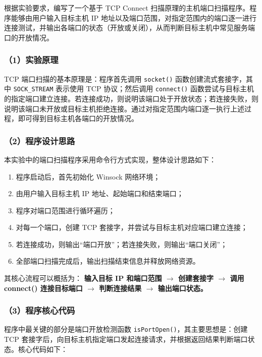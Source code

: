 \documentclass[12pt]{ctexart}
\begin{document}
根据实验要求，编写了一个基于 TCP Connect 扫描原理的主机端口扫描程序。程序能够由用户输入目标主机 IP 地址以及端口范围，对指定范围内的端口逐一进行连接测试，并输出各端口的状态（开放或关闭），从而判断目标主机中常见服务端口的开放情况。

\subsubsection*{（1）实验原理}

TCP 端口扫描的基本原理是：程序首先调用 \texttt{socket()} 函数创建流式套接字，其中 \texttt{SOCK\_STREAM} 表示使用 TCP 协议；然后调用 \texttt{connect()} 函数尝试与目标主机的指定端口建立连接。若连接成功，则说明该端口处于开放状态；若连接失败，则说明该端口未开放或目标主机拒绝连接。通过对指定范围内端口逐一执行上述过程，即可得到目标主机各端口的开放情况。

\subsubsection*{（2）程序设计思路}

本实验中的端口扫描程序采用命令行方式实现，整体设计思路如下：

\begin{enumerate}
    \item 程序启动后，首先初始化 Winsock 网络环境；
    \item 由用户输入目标主机 IP 地址、起始端口和结束端口；
    \item 程序对端口范围进行循环遍历；
    \item 对每一个端口，创建 TCP 套接字，并尝试与目标主机对应端口建立连接；
    \item 若连接成功，则输出“端口开放”；若连接失败，则输出“端口关闭”；
    \item 全部端口扫描完成后，输出扫描结束信息并释放网络资源。
\end{enumerate}

其核心流程可以概括为：  
\textbf{输入目标 IP 和端口范围 $\rightarrow$ 创建套接字 $\rightarrow$ 调用 connect() 连接目标端口 $\rightarrow$ 判断连接结果 $\rightarrow$ 输出端口状态。}

\subsubsection*{（3）程序核心代码}

程序中最关键的部分是端口开放检测函数 \texttt{isPortOpen()}，其主要思想是：创建 TCP 套接字后，向目标主机指定端口发起连接请求，并根据返回结果判断端口状态。核心代码如下：
\end{document}
